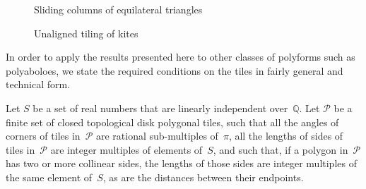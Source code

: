\begin{figure}[htp!]
\begin{center}
\end{center}
\caption{Sliding columns of equilateral triangles}
\label{fig:slidtriangles}
\end{figure}

\begin{figure}[htp!]
\begin{center}
\end{center}
\caption{Unaligned tiling of kites}
\label{fig:slidhextrikites}
\end{figure}

In order to apply the results presented here to other classes of 
polyforms such as polyaboloes,
we state the required conditions on the tiles in fairly general and
technical form.

Let $S$ be a set of real numbers that are linearly
independent over~$\mathbb{Q}$.  Let $\mathcal{P}$ be a finite set of
closed topological disk polygonal tiles, such that all the angles
of corners of tiles in~$\mathcal{P}$ are rational sub-multiples of~$\pi$,
all the lengths of sides of tiles in~$\mathcal{P}$ are integer
multiples of elements of~$S$, and such that, if a polygon
in~$\mathcal{P}$ has two or more collinear sides,
the lengths of those sides are integer multiples of the same element
of~$S$, as are the distances between their endpoints.

